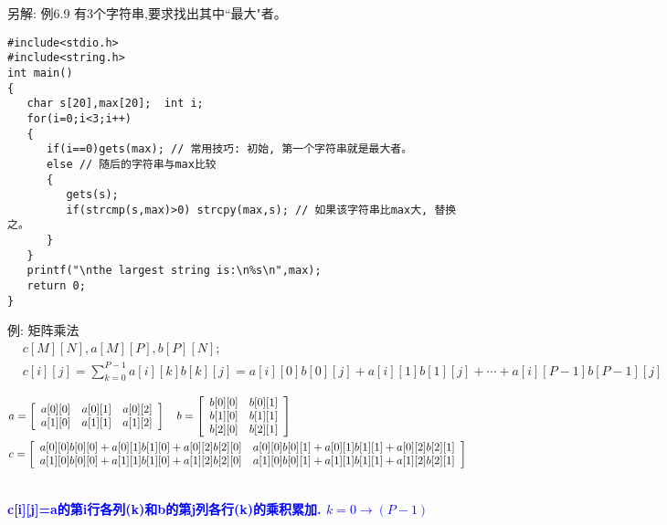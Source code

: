 \begin{frame}{\small{另解: 例6.9 有3个字符串,要求找出其中``最大"者。}}
\begin{lstlisting}
#include<stdio.h>
#include<string.h>
int main()                   
{  
   char s[20],max[20];  int i;
   for(i=0;i<3;i++)
   {
      if(i==0)gets(max); // 常用技巧: 初始, 第一个字符串就是最大者。
      else // 随后的字符串与max比较
      {
         gets(s);
         if(strcmp(s,max)>0) strcpy(max,s); // 如果该字符串比max大, 替换之。
      }
   }
   printf("\nthe largest string is:\n%s\n",max);
   return 0;           
}
\end{lstlisting}
\end{frame}  


\begin{frame}{例: 矩阵乘法}
\vspace{-0.4cm}
\begin{align*}
&c[M][N],a[M][P],b[P][N];\\ &c[i][j]=\sum_{k=0}^{P-1}a[i][k]b[k][j]=a[i][0]b[0][j]+a[i][1]b[1][j]+\cdots +a[i][P-1]b[P-1][j]
\end{align*}
\begin{scriptsize}
\begin{align*}
&a=\left[\begin{array}[l]{ccc}
a[0][0] & a[0][1] & a[0][2]\\
a[1][0] & a[1][1] & a[1][2]
\end{array}
\right]\quad
b=\left[\begin{array}[l]{ccc}
b[0][0] & b[0][1] \\
b[1][0] & b[1][1] \\
b[2][0] & b[2][1]
\end{array}
\right]\\
&c=\left[\begin{array}[l]{ccc}
a[0][0]b[0][0]+a[0][1]b[1][0]+a[0][2]b[2][0] & a[0][0]b[0][1]+a[0][1]b[1][1]+a[0][2]b[2][1] \\
a[1][0]b[0][0]+a[1][1]b[1][0]+a[1][2]b[2][0] & a[1][0]b[0][1]+a[1][1]b[1][1]+a[1][2]b[2][1]
\end{array}
\right]
\end{align*}
\end{scriptsize}
\\
\pause
\bigskip
\textbf{\textcolor{blue}{c[i][j]=a的第i行各列(k)和b的第j列各行(k)的乘积累加. $k=0\to(P-1)$}}
\end{frame}

